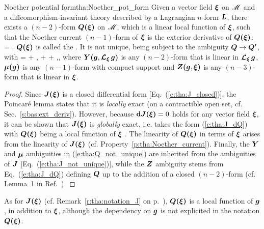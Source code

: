 \begin{tprop}{Noether potential form}{tha:Noether_pot_form}
Given a vector field $\bm{\xi}$ on $\mathscr{M}$ and a diffeomorphism-invariant theory described by a Lagrangian $n$-form $\bm{L}$, there exists a $(n-2)$-form $\bm{Q}\textbf{(}\bm{\xi}\textbf{)}$ on $\mathscr{M}$,
which is a linear local function of $\bm{\xi}$, such that
the Noether current $(n-1)$-form of $\bm{\xi}$ is the exterior derivative of $\bm{Q}\textbf{(}\bm{\xi}\textbf{)}$:
\be \label{e:tha:J_dQ}
    \lld\w{\xi}\rld = \dd {}\lld\w{\xi}\rld .
\ee
$\bm{Q}\textbf{(}\bm{\xi}\textbf{)}$ is called the . It is not unique, being subject to the ambiguity
$\bm{Q} \to \bm{Q'}$, with
\be \label{e:tha:Q_not_unique}
    \lld\w{\xi}\rld = \lld\w{\xi}\rld + \lld{},\Lie{\xi}\rld
     + \w{\xi}\cdot\w{\mu}\lld{}\rld + \dd{}\lld{},\w{\xi}\rld ,
\ee
where $\bm{Y}\textbf{(}\bm{g},\bm{\mathcal{L}}_{\bm{\xi}}\,\bm{g}\textbf{)}$ is any $(n-2)$-form that is linear in $\bm{\mathcal{L}}_{\bm{\xi}}\,\bm{g}$, $\bm{\mu}\textbf{(}\bm{g}\textbf{)}$ is any $(n-1)$-form with compact support
and
$\bm{Z}\textbf{(}\bm{g},\bm{\xi}\textbf{)} $ is any $(n-3)$-form that is linear in $\bm{\xi}$.
\end{tprop}

\begin{proof}
Since $\bm{J}\textbf{(}\bm{\xi}\textbf{)}$ is a closed differential form [Eq.~(\ref{e:tha:J_closed})], the Poincaré lemma
states that it is \emph{locally} exact (on a contractible open set, cf. Sec.~\ref{s:bas:ext_deriv}). However, because
$\mathbf{d} \bm{J}\textbf{(}\bm{\xi}\textbf{)}  = 0$ holds for any vector field $\bm{\xi}$, it can be shown that
$\bm{J}\textbf{(}\bm{\xi}\textbf{)}$ is \emph{globally} exact, i.e. takes the form (\ref{e:tha:J_dQ})
with $\bm{Q}\textbf{(}\bm{\xi}\textbf{)}$ being a local function of $\bm{\xi}$ \cite{Wald90}.
The linearity of $\bm{Q}\textbf{(}\bm{\xi}\textbf{)}$ in terms of $\bm{\xi}$ arises from the linearity
of $\bm{J}\textbf{(}\bm{\xi}\textbf{)}$ (cf. Property~\ref{p:tha:Noether_current}).
Finally, the $\bm{Y}$ and $\bm{\mu}$ ambiguities in (\ref{e:tha:Q_not_unique}) are inherited from the ambiguities of $\bm{J}$ [Eq.~(\ref{e:tha:J_not_unique})], while the $\bm{Z}$ ambiguity stems from Eq.~(\ref{e:tha:J_dQ}) defining
$\bm{Q}$ up to the addition of a closed $(n-2)$-form (cf. Lemma~1 in Ref.~\cite{Wald90}).
\end{proof}

\begin{remark}
\label{r:tha:notation_Q}
As for $\bm{J}\textbf{(}\bm{\xi}\textbf{)}$ (cf. Remark~\ref{r:tha:notation_J} on p.~\pageref{r:tha:notation_J}), $\bm{Q}\textbf{(}\bm{\xi}\textbf{)}$ is a local function of $\bm{g}$, in addition
to $\bm{\xi}$, although the dependency on $\bm{g}$ is not explicited in the notation
$\bm{Q}\textbf{(}\bm{\xi}\textbf{)}$.
\end{remark}

